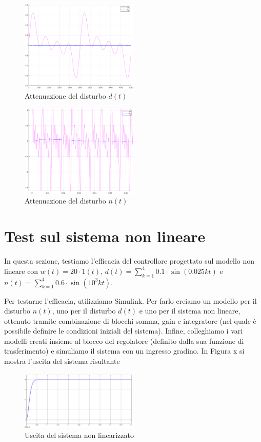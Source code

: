 \documentclass[a4paper, 11pt]{article}
\begin{document}
\begin{figure}[h]
\centering
\includegraphics[width=0.5\textwidth]{images/Figure_6.png}
\caption{Attenuazione del disturbo $d(t)$}
\label{fig:distD}
\end{figure}

\begin{figure}[h]
\centering
\includegraphics[width=0.5\textwidth]{images/Figure_7.png}
\caption{Attenuazione del disturbo $n(t)$}
\label{fig:distN}
\end{figure}



\section{Test sul sistema non lineare}
In questa sezione, testiamo l'efficacia del controllore progettato sul modello non lineare con $w(t) = 20 \cdot 
 1(t) $, $d(t)= \sum_{k=1}^4 0.1 \cdot \sin(0.025kt)$ e $n(t)= \sum_{k=1}^4 0.6 \cdot \sin(10^3 kt)  $.

 Per testarne l'efficacia, utilizziamo Simulink. Per farlo creiamo un modello per il disturbo $n(t)$, uno per il disturbo $d(t)$ e uno per il sistema non lineare, ottenuto tramite combinazione di blocchi somma, gain e integratore (nel quale è possibile definire le condizioni iniziali del sistema). Infine, colleghiamo i vari modelli creati insieme al blocco del regolatore (definito dalla sua funzione di trasferimento) e simuliamo il sistema con un ingresso gradino. In Figura x si mostra l'uscita del sistema risultante
\begin{figure}[h]
\centering
\includegraphics[width=0.5\textwidth]{images/test_non_lineare.png}
\caption{Uscita del sistema non linearizzato}
\label{fig:test_non_lineare}
\end{figure}
\end{document}
